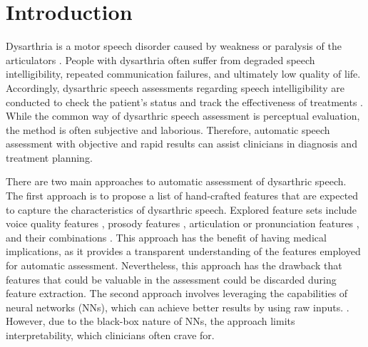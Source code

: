 \section{Introduction} \label{sec:intro}
Dysarthria is a motor speech disorder caused by weakness or paralysis of the articulators \cite{darley1972dysarthria}.
People with dysarthria often suffer from degraded speech intelligibility, repeated communication failures, and ultimately low quality of life. 
Accordingly, dysarthric speech assessments regarding speech intelligibility are conducted to check the patient's status and track the effectiveness of treatments \cite{kent1989toward}.
While the common way of dysarthric speech assessment is perceptual evaluation, the method is often subjective and laborious. 
Therefore, automatic speech assessment with objective and rapid results can assist clinicians in diagnosis and treatment planning.




There are two main approaches to automatic assessment
of dysarthric speech. 
The first approach is to propose a list of hand-crafted features that are expected to capture the characteristics of dysarthric speech.
Explored feature sets include voice quality features \cite{narendra2021automatic}, prosody features \cite{hernandez2020prosody}, articulation or pronunciation features \cite{kim2012automatic, liu2021language}, and their combinations \cite{vasquez2018towards, yeo2022multilingual}.
This approach has the benefit of having medical implications, as it provides a transparent understanding of the features employed for automatic assessment. 
Nevertheless, this approach has the drawback that features that could be valuable in the assessment could be discarded during feature extraction.
The second approach involves leveraging the capabilities of neural networks (NNs), which can achieve better results by using raw inputs. \cite{yeo2022automatic, joshy2023dysarthria}.
However, due to the black-box nature of NNs, the approach limits interpretability, which clinicians often crave for.

